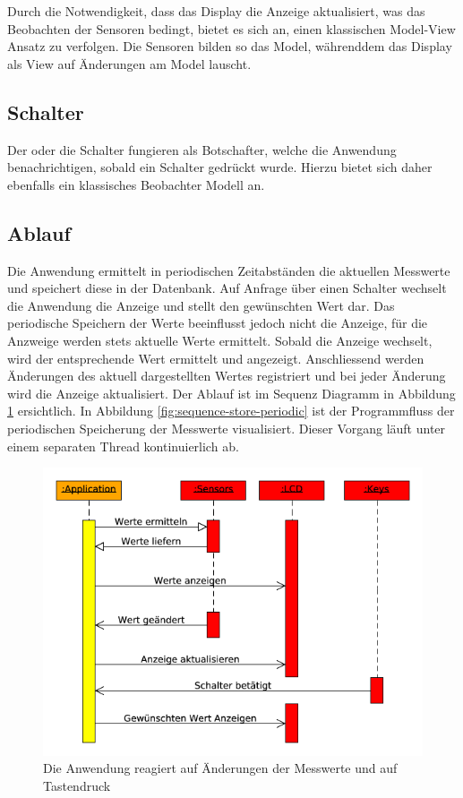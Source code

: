\documentclass[
    10pt,
    a4paper,
]{scrartcl}
\begin{document}
Durch die Notwendigkeit, dass das Display die Anzeige aktualisiert, was das Beobachten der
Sensoren bedingt, bietet es sich an, einen klassischen Model-View Ansatz zu verfolgen. Die
Sensoren bilden so das Model, währenddem das Display als View auf Änderungen am Model
lauscht.

\subsection{Schalter}
Der oder die Schalter fungieren als Botschafter, welche die Anwendung benachrichtigen,
sobald ein Schalter gedrückt wurde. Hierzu bietet sich daher ebenfalls ein klassisches
Beobachter Modell an.

\subsection{Ablauf}

Die Anwendung ermittelt in periodischen Zeitabständen die aktuellen Messwerte und
speichert diese in der Datenbank. Auf Anfrage über einen Schalter wechselt die Anwendung
die Anzeige und stellt den gewünschten Wert dar. Das periodische Speichern der Werte
beeinflusst jedoch nicht die Anzeige, für die Anzweige werden stets aktuelle Werte
ermittelt. Sobald die Anzeige wechselt, wird der entsprechende Wert ermittelt und
angezeigt. Anschliessend werden Änderungen des aktuell dargestellten Wertes registriert
und bei jeder Änderung wird die Anzeige aktualisiert. Der Ablauf ist im Sequenz Diagramm
in Abbildung \ref{fig:sequence-startup-running} ersichtlich. In Abbildung
\ref{fig:sequence-store-periodic} ist der Programmfluss der periodischen Speicherung der
Messwerte visualisiert. Dieser Vorgang läuft unter einem separaten Thread kontinuierlich
ab.

\begin{figure}[ht]
    \centering
    \includegraphics[width=.7\textwidth]{sequence-startup-running}
    \caption{Die Anwendung reagiert auf Änderungen der Messwerte und auf Tastendruck}
    \label{fig:sequence-startup-running}
\end{figure}
\end{document}

